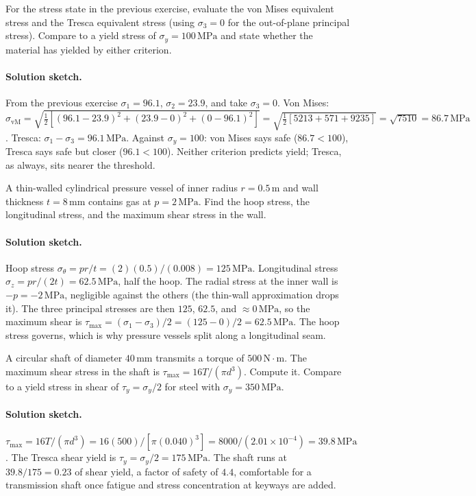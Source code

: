 \begin{exercise}
For the stress state in the previous exercise, evaluate the von
Mises equivalent stress and the Tresca equivalent stress (using
$\sigma_3 = 0$ for the out-of-plane principal stress). Compare to a
yield stress of $\sigma_y = 100\,\text{MPa}$ and state whether the
material has yielded by either criterion.
\paragraph{Solution sketch.} From the previous exercise $\sigma_1 =
96.1$, $\sigma_2 = 23.9$, and take $\sigma_3 = 0$. Von Mises:
$\sigma_{\text{vM}} = \sqrt{\tfrac{1}{2}[(96.1-23.9)^2 + (23.9-0)^2 +
(0-96.1)^2]} = \sqrt{\tfrac{1}{2}[5213 + 571 + 9235]} = \sqrt{7510} =
86.7\,\text{MPa}$. Tresca: $\sigma_1 - \sigma_3 = 96.1\,\text{MPa}$.
Against $\sigma_y = 100$: von Mises says safe ($86.7 < 100$), Tresca
says safe but closer ($96.1 < 100$). Neither criterion predicts yield;
Tresca, as always, sits nearer the threshold.
\end{exercise}

\begin{exercise}
A thin-walled cylindrical pressure vessel of inner radius $r =
0.5\,\si{\meter}$ and wall thickness $t = 8\,\si{\milli\meter}$
contains gas at $p = 2\,\text{MPa}$. Find the hoop stress, the
longitudinal stress, and the maximum shear stress in the wall.
\paragraph{Solution sketch.} Hoop stress $\sigma_{\theta} = pr/t =
(2)(0.5)/(0.008) = 125\,\text{MPa}$. Longitudinal stress
$\sigma_z = pr/(2t) = 62.5\,\text{MPa}$, half the hoop. The radial
stress at the inner wall is $-p = -2\,\text{MPa}$, negligible against
the others (the thin-wall approximation drops it). The three principal
stresses are then $125$, $62.5$, and $\approx 0\,\text{MPa}$, so the
maximum shear is $\tau_{\max} = (\sigma_1 - \sigma_3)/2 = (125 - 0)/2 =
62.5\,\text{MPa}$. The hoop stress governs, which is why pressure
vessels split along a longitudinal seam.
\end{exercise}

\begin{exercise}
A circular shaft of diameter $40\,\si{\milli\meter}$ transmits a
torque of $500\,\text{N}\cdot\text{m}$. The maximum shear stress in
the shaft is $\tau_{\max} = 16T / (\pi d^3)$. Compute it. Compare
to a yield stress in shear of $\tau_y = \sigma_y/2$ for steel with
$\sigma_y = 350\,\text{MPa}$.
\paragraph{Solution sketch.} $\tau_{\max} = 16T/(\pi d^3) = 16(500)/
[\pi (0.040)^3] = 8000/(2.01\times 10^{-4}) = 39.8\,\text{MPa}$. The
Tresca shear yield is $\tau_y = \sigma_y/2 = 175\,\text{MPa}$. The
shaft runs at $39.8/175 = 0.23$ of shear yield, a factor of safety of
$4.4$, comfortable for a transmission shaft once fatigue and stress
concentration at keyways are added.
\end{exercise}

